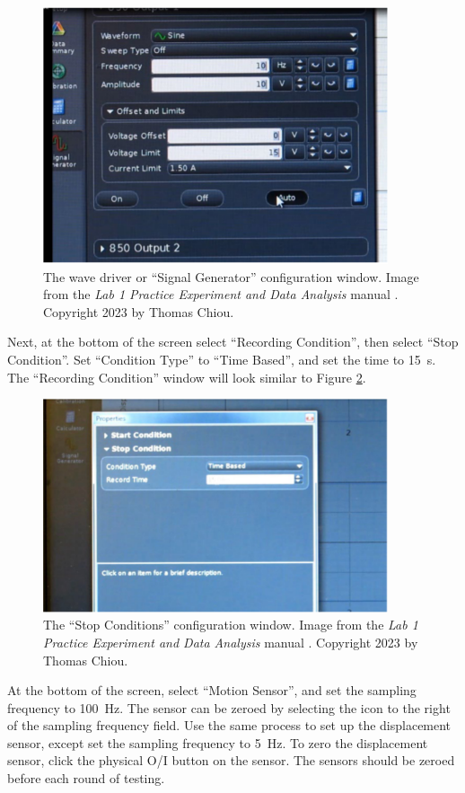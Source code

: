 \documentclass[12 pt]{report}
\begin{document}
\begin{figure}[htbp]
\centering
\includegraphics[width=4in]{images/Wave_Driver_Setup}
\caption{The wave driver or ``Signal Generator'' configuration window. Image from the \textit{Lab 1 Practice Experiment and Data Analysis} manual \cite{lab_procedures}. Copyright 2023 by Thomas Chiou.}
\label{fig:wave_driver_setup}
\end{figure}

Next, at the bottom of the screen select ``Recording Condition'', then select ``Stop Condition''. Set ``Condition Type'' to ``Time Based'', and set the time to \qty{15}{\s}. The ``Recording Condition'' window will look similar to Figure \ref{fig:stop_conditions}. 

\begin{figure}[htbp]
\centering
\includegraphics[width=4in]{images/Stop_Conditions}
\caption{The ``Stop Conditions'' configuration window. Image from the \textit{Lab 1 Practice Experiment and Data Analysis} manual \cite{lab_procedures}. Copyright 2023 by Thomas Chiou.}
\label{fig:stop_conditions}
\end{figure}

At the bottom of the screen, select ``Motion Sensor'', and set the sampling frequency to \qty{100}{\hertz}. The sensor can be zeroed by selecting the icon to the right of the sampling frequency field. Use the same process to set up the displacement sensor, except set the sampling frequency to \qty{5}{\hertz}. To zero the displacement sensor, click the physical O/I button on the sensor. The sensors should be zeroed before each round of testing.
\end{document}
